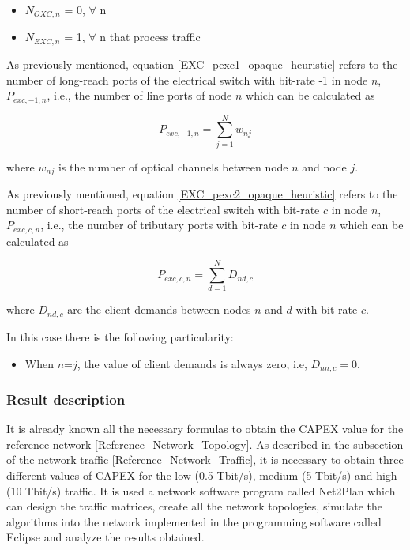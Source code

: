 \begin{itemize}
  \item $N_{OXC,n}$ = 0, \quad $\forall$ n
  \item $N_{EXC,n}$ = 1, \quad $\forall$ n that process traffic
\end{itemize}

As previously mentioned, equation \ref{EXC_pexc1_opaque_heuristic} refers to the number of long-reach ports of the electrical switch with bit-rate -1 in node $n$, $P_{exc,-1,n}$, i.e., the number of line ports of node $n$ which can be calculated as

\begin{equation}
P_{exc,-1,n} = \sum_{j=1}^{N} w_{nj}
\label{EXC_pexc1_opaque_heuristic}
\end{equation}

\vspace{11pt}
where $w_{nj}$ is the number of optical channels between node $n$ and node $j$.

\newpage
\vspace{11pt}
As previously mentioned, equation \ref{EXC_pexc2_opaque_heuristic} refers to the number of short-reach ports of the
electrical switch with bit-rate $c$ in node $n$, $P_{exc,c,n}$, i.e., the number of tributary ports with bit-rate $c$ in node $n$ which can be calculated as

\begin{equation}
P_{exc,c,n} = \sum_{d=1}^{N} D_{nd,c}
\label{EXC_pexc2_opaque_heuristic}
\end{equation}

\vspace{11pt}
where $D_{nd,c}$ are the client demands between nodes $n$ and $d$ with bit rate $c$.

\vspace{11pt}
In this case there is the following particularity:

\begin{itemize}
  \item When $n$=$j$, the value of client demands is always zero, i.e, $D_{nn,c}=0$.
\end{itemize}

\subsubsection{Result description}

It is already known all the necessary formulas to obtain the CAPEX value for the reference network \ref{Reference_Network_Topology}. As described in the subsection of the network traffic \ref{Reference_Network_Traffic}, it is necessary to obtain three different values of CAPEX for the low (0.5 Tbit/s), medium (5 Tbit/s) and high (10 Tbit/s) traffic. It is used a network software program called Net2Plan which can design the traffic matrices, create all the network topologies, simulate the algorithms into the network implemented in the programming software called Eclipse and analyze the results obtained.

